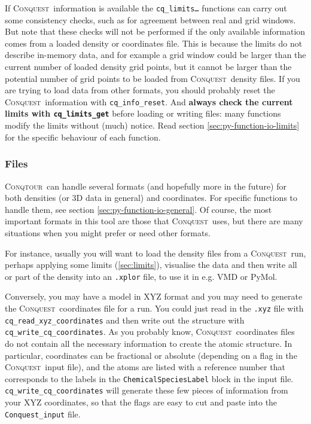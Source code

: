 \documentclass[a4paper,notitlepage,11pt]{article}
\def\CQ{\textsc{Conquest}}
\def\Conqtour{\textsc{Conqtour}}
\begin{document}
If \CQ\ information is available the \texttt{cq\_limits\ldots} functions
can carry out some consistency checks, such as for agreement between real and
grid windows. But note that these checks will not be performed if the only
available information comes from a loaded density or coordinates file. This
is because the limits do not describe in-memory data, and for example a grid window could be larger than the
current number of loaded density grid points, but it cannot be larger than the
potential number of grid points to be loaded from \CQ\ density files. If you are
trying to load data from other formats, you should probably reset the \CQ\
information with \texttt{cq\_info\_reset}. And {\bf always check the current
limits with \texttt{cq\_limits\_get}} before loading or writing files: many
functions modify the limits without (much) notice. Read section
\ref{sec:py-function-io-limits} for the specific behaviour of each function.


\subsubsection{Files}
\label{sec:files}

\Conqtour\ can handle several formats (and hopefully more in the future) for
both densities (or 3D data in general) and coordinates. For specific functions
to handle them, see section \ref{sec:py-function-io-general}. Of course, the
most important formats in this tool are those that \CQ\ uses, but there are
many situations when you might prefer or need other formats.

For instance, usually you will want to load the density files from a \CQ\ run,
perhaps applying some limits (\ref{sec:limits}), visualise the data and then
write all or part of the density into an \texttt{.xplor} file, to use it in e.g.
VMD or PyMol.

Conversely, you may have a model in XYZ format and you may need to generate the
\CQ\ coordinates file for a run. You could just read in the \texttt{.xyz} file with
\texttt{cq\_read\_xyz\_coordinates} and then write out the structure with
\texttt{cq\_write\_cq\_coordinates}. As you probably know, \CQ\ coordinates 
files do not contain all the necessary information to create the atomic
structure. In particular, coordinates can be fractional or absolute (depending
on a flag in the \CQ\ input file), and the atoms are listed with a reference 
number that corresponds to the labels in the \texttt{ChemicalSpeciesLabel} block
in the input file. \texttt{cq\_write\_cq\_coordinates} will generate
these few pieces of information from your XYZ coordinates, so that the flags are
easy to cut and paste into the \texttt{Conquest\_input} file.
\end{document}
